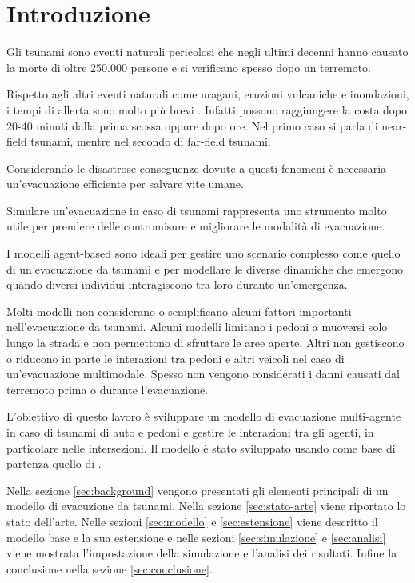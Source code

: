 \section{Introduzione}
Gli tsunami sono eventi naturali pericolosi che negli ultimi decenni 
hanno causato la morte di oltre 250.000 persone e si verificano spesso 
dopo un terremoto.

Rispetto agli altri eventi naturali come uragani, eruzioni vulcaniche e inondazioni, 
i tempi di allerta sono molto più brevi \parencite{katada2006integrated}.
%
Infatti possono raggiungere la costa dopo 20-40 minuti dalla prima scossa oppure dopo ore.
Nel primo caso si parla di near-field tsunami, mentre nel secondo di far-field tsunami. 

Considerando le disastrose conseguenze dovute a questi fenomeni è necessaria un'evacuazione efficiente per salvare vite umane. 

Simulare un'evacuazione in caso di tsunami rappresenta uno strumento molto utile per 
prendere delle contromisure e migliorare le modalità di evacuazione.

I modelli agent-based sono ideali per gestire uno scenario complesso come quello di un'evacuazione da tsunami e
per modellare le diverse dinamiche che emergono quando diversi individui interagiscono tra loro durante un'emergenza. 

Molti modelli non considerano o semplificano alcuni fattori importanti nell'evacuazione da tsunami.
Alcuni modelli limitano i pedoni a muoversi solo lungo la strada e non permettono di sfruttare le aree aperte. 
Altri non gestiscono o riducono in parte le interazioni tra pedoni e altri veicoli nel caso di un'evacuazione multimodale.
%
Spesso non vengono considerati i danni causati dal terremoto prima o durante l'evacuazione.

L'obiettivo di questo lavoro è sviluppare un modello di evacuazione multi-agente in caso di tsunami
di auto e pedoni e gestire le interazioni tra gli agenti, 
in particolare nelle intersezioni.
%
Il modello è stato sviluppato usando come base di partenza quello di \textcite{mostafizi2019agent}.

Nella sezione \ref{sec:background} vengono presentati gli elementi principali di un modello di evacuzione da tsunami.
Nella sezione \ref{sec:stato-arte} viene riportato lo stato dell'arte.
%
Nelle sezioni \ref{sec:modello} e \ref{sec:estensione} viene descritto il modello base e la sua estensione e 
nelle sezioni \ref{sec:simulazione} e \ref{sec:analisi} viene mostrata l'impostazione della simulazione e 
l'analisi dei risultati.
%
Infine la conclusione nella sezione \ref{sec:conclusione}.
